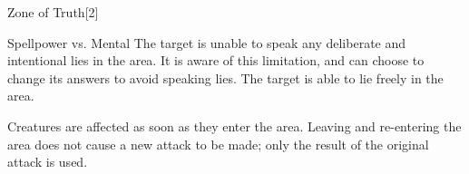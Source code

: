 \begin{spellsection}{Zone of Truth}[2]
    \begin{spellheader}
    \end{spellheader}
    \begin{spellcontent}
        \begin{spelltargetinginfo}
        \end{spelltargetinginfo}
        \begin{spelleffects}
            \begin{spellattack}{Spellpower vs. Mental}
                \spellsuccess The target is unable to speak any deliberate and intentional lies in the area. It is aware of this limitation, and can choose to change its answers to avoid speaking lies.
                \spellfailure The target is able to lie freely in the area.
            \end{spellattack}
            \spelldur \durlong
        \end{spelleffects}
    \end{spellcontent}
    \begin{spellfooter}
        \spellnotes Creatures are affected as soon as they enter the area. Leaving and re-entering the area does not cause a new attack to be made; only the result of the original attack is used.
    \end{spellfooter}
\end{spellsection}
